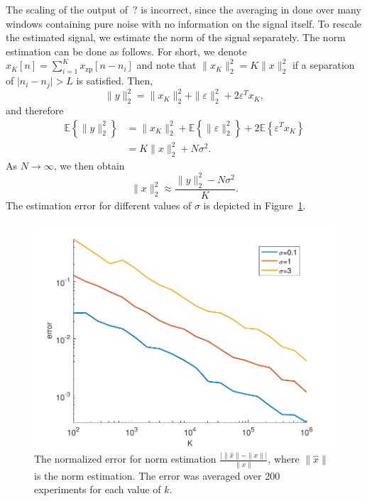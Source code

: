 \documentclass[journal]{IEEEtran}
\numberwithin{equation}{section}
\numberwithin{figure}{section}
\theoremstyle{plain}
\theoremstyle{definition}
\theoremstyle{remark}
\theoremstyle{plain}
\theoremstyle{remark}
\theoremstyle{plain}
\theoremstyle{plain}
\newcommand{\E}[1]{\mathbb{E}\left\{{#1} \right\}}
\newcommand{\xz}{x_{\textrm{zp}}}
\begin{document}
The scaling of the output of~? is incorrect, since the averaging in done over many windows containing pure noise with no information on the signal itself. 
To rescale the estimated signal, we estimate the norm of the signal separately.
The norm estimation can be done as follows. For short, we denote $x_K[n]=\sum_{i=1}^K \xz[n-n_i]$ and note that $\|x_K\|_2^2 = K\|x\|_2^2$ if a separation of $\vert n_i - n_j\vert >L$ is satisfied. 
Then,
\begin{equation}
\| y\|_2^2 =  \| x_K\|_2^2 + \|\varepsilon\|_2^2 + 2\varepsilon^Tx_K, 
\end{equation}  
and therefore 
\begin{equation}
\begin{split}
\E{\| y\|_2^2} &=  \| x_K\|_2^2 + \E{\|\varepsilon\|_2^2} + 2\E{\varepsilon^Tx_K} \\ 
&= K\|x\|_2^2 + N\sigma^2. 
\end{split}	 
\end{equation}   
As $N\to\infty$,  we then obtain
\begin{equation} \label{eq:norm_estimation}
\|x\|_2^2 \approx \frac{\| y\|_2^2 - N\sigma^2}{K}. 
\end{equation}
The estimation error for different values of $\sigma$ is depicted in Figure~\ref{fig:norn_error}. 

\begin{figure}
	\begin{center}
		\includegraphics[scale = .5]{NormError}		
	\end{center}
	\caption{The normalized error for norm estimation $\frac{\vert \|\hat{x}\|  - \|x\|\vert }{\|x\|}$, where $\|\hat{x}\|$ is the norm estimation. The error was averaged over 200 experiments for each value of $k$.}
	\label{fig:norn_error}
\end{figure}
\end{document}
